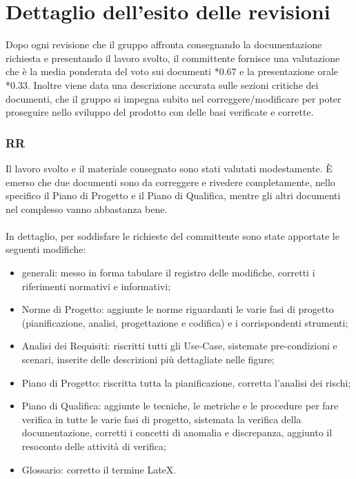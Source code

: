 \section{Dettaglio dell'esito delle revisioni}
Dopo ogni revisione che il gruppo affronta consegnando la documentazione
richiesta e presentando il lavoro svolto, il committente fornisce una
valutazione che \`e la media ponderata del voto sui documenti *0.67 e la
presentazione orale *0.33. Inoltre viene data una descrizione accurata
sulle sezioni critiche dei documenti, che il gruppo si impegna subito
nel correggere/modificare per poter proseguire nello sviluppo del prodotto con delle
basi verificate e corrette.

\subsubsection*{RR}
Il lavoro svolto e il materiale consegnato sono stati valutati modestamente. \`E
emerso che due documenti sono da correggere e rivedere completamente, nello
specifico il Piano di Progetto e il Piano di Qualifica, mentre gli altri documenti nel complesso
vanno abbastanza bene. \\ \\
In dettaglio, per soddisfare le richieste del committente sono state apportate
le seguenti modifiche:
\begin{itemize}
  \item generali: messo in forma tabulare il registro delle modifiche, corretti
  i riferimenti normativi e informativi;
  \item Norme di Progetto: aggiunte le norme riguardanti le varie fasi di
  progetto (pianificazione, analisi, progettazione e codifica) e i corrispondenti strumenti;
  \item Analisi dei Requisiti: riscritti tutti gli Use-Case, sistemate pre-condizioni e scenari,
  inserite delle descrizioni pi\`u dettagliate nelle figure;
  \item Piano di Progetto: riscritta tutta la pianificazione, corretta l'analisi
  dei rischi;
  \item Piano di Qualifica: aggiunte le tecniche, le metriche e le procedure per
  fare verifica in tutte le varie fasi di progetto, sistemata la verifica della
  documentazione, corretti i concetti di anomalia e discrepanza, aggiunto
  il resoconto delle attivit\`a di verifica;
  \item Glossario: corretto il termine LateX.
\end{itemize}

